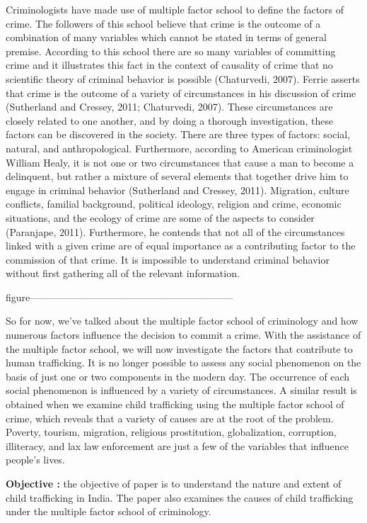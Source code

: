 \begin{multicols}{2}
\noi
Criminologists
have made use of multiple factor school to define the factors of crime. The followers
of this school believe that crime is the outcome of a combination of many variables
which cannot be stated in terms of general premise. According to this school there are
so many variables of committing crime and it illustrates this fact in the context of
causality of crime that no scientific theory of criminal behavior is possible
(Chaturvedi, 2007). Ferrie asserts that crime is the outcome of a variety of
circumstances in his discussion of crime (Sutherland and Cressey, 2011; Chaturvedi,
2007). These circumstances are closely related to one another, and by doing a thorough
investigation, these factors can be discovered in the society. There are three types of
factors: social, natural, and anthropological. Furthermore, according to American
criminologist William Healy, it is not one or two circumstances that cause a man to
become a delinquent, but rather a mixture of several elements that together drive him
to engage in criminal behavior (Sutherland and Cressey, 2011). Migration, culture
conflicts, familial background, political ideology, religion and crime, economic
situations, and the ecology of crime are some of the aspects to consider (Paranjape,
2011). Furthermore, he contends that not all of the circumstances linked with a given
crime are of equal importance as a contributing factor to the commission of that crime.
It is impossible to understand criminal behavior without first gathering all of the
relevant information.

figure--------------------------------------------------------------

\noi
So for now, we've talked about the multiple factor school of criminology and how
numerous factors influence the decision to commit a crime. With the assistance of the
multiple factor school, we will now investigate the factors that contribute to human
trafficking. It is no longer possible to assess any social phenomenon on the basis of just
one or two components in the modern day. The occurrence of each social phenomenon
is influenced by a variety of circumstances. A similar result is obtained when we
examine child trafficking using the multiple factor school of crime, which reveals that
a variety of causes are at the root of the problem. Poverty, tourism, migration, religious
prostitution, globalization, corruption, illiteracy, and lax law enforcement are just a few
of the variables that influence people's lives.

\noi
\textbf{Objective :} the objective of paper is to understand the nature and extent of child
trafficking in India. The paper also examines the causes of child trafficking under the
multiple factor school of criminology.


\end{multicols}
